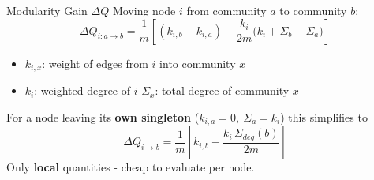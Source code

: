 \documentclass[aspectratio=169]{beamer}
\begin{document}
\begin{frame}{Modularity Gain $\Delta Q$}
    Moving node $i$ from community $a$ to community $b$:
    \[
        \Delta Q_{i:a\to b} = \frac{1}{m}\left[(k_{i,b}-k_{i,a})
            - \frac{k_i}{2m}\bigl(k_i + \Sigma_b - \Sigma_a\bigr)\right]
    \]
    \begin{itemize}\small
        \item $k_{i,x}$: weight of edges from $i$ into community $x$
        \item $k_i$: weighted degree of $i$ \qquad $\Sigma_x$: total degree of community $x$
    \end{itemize}
    \vspace{0.4em}
    For a node leaving its \textbf{own singleton} ($k_{i,a}=0,\ \Sigma_a=k_i$) this simplifies to
    \[
        \boxed{\ \Delta Q_{i\to b} = \frac{1}{m}\left[k_{i,b}
            - \frac{k_i\,\Sigma_{deg}(b)}{2m}\right]\ }
    \]
    \centering\small Only \textbf{local} quantities - cheap to evaluate per node.
\end{frame}
\end{document}
